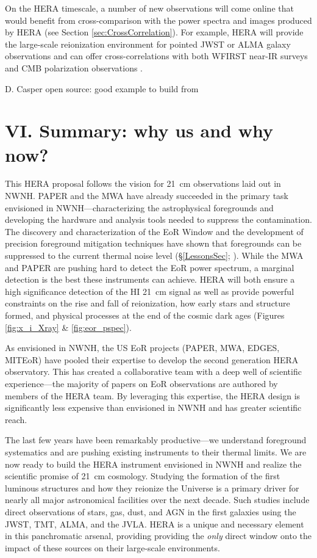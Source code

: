 \documentclass[preprint]{aastex}
\def\HI{{H{\small I }}}
\begin{document}
On the HERA timescale, a number of new observations will come online that would benefit from cross-comparison with the power spectra and images produced by HERA (see Section \ref{sec:CrossCorrelation}). For example, HERA will provide the large-scale reionization environment for pointed JWST or ALMA galaxy observations and can offer cross-correlations with both WFIRST near-IR surveys \citep{lidz_et_al2009} and CMB polarization observations \citep{tashiro_et_al2010}.
 
D. Casper open source: good example to build from


\section{VI. Summary: why us and why now?} %

This HERA proposal follows the vision for 21~cm observations laid out in NWNH.
PAPER and the MWA have already succeeded in the primary task envisioned in
NWNH---characterizing the astrophysical foregrounds and developing the hardware
and analysis 
tools needed to suppress the contamination. The discovery and
characterization of the EoR Window and the development of precision foreground
mitigation techniques have shown that foregrounds can be suppressed to the current
thermal noise level (\S \ref{LessonsSec}; \citealt{parsons_et_al2013}). While the MWA
and PAPER are pushing hard to detect the EoR power spectrum, %
a marginal detection is the best these instruments can achieve.
HERA will both ensure a high significance detection of the \HI 21~cm 
signal as
well as provide powerful constraints on the rise and fall of reionization, how
early stars and structure formed, and physical processes at the end of the
cosmic dark ages (Figures \ref{fig:x_i_Xray} \& \ref{fig:eor_pspec}).

As envisioned in NWNH, the US EoR projects (PAPER, MWA, EDGES, MITEoR) have
pooled their expertise to develop the second generation HERA observatory. This
has created a collaborative team with a deep well of scientific
experience---the majority of papers on EoR observations are authored by members
of the HERA team. By leveraging this expertise, the HERA design is significantly
less expensive than envisioned in 
NWNH and has greater scientific reach.

The last few years have been remarkably productive---we
understand foreground systematics and are pushing 
existing
instruments to their thermal limits. We are now ready to build the HERA
instrument envisioned in NWNH and realize the scientific promise of 21~cm
cosmology.
Studying the formation of the first luminous structures 
and how they reionize the Universe is a primary driver for 
nearly all major astronomical facilities over the next decade.
Such studies include direct 
observations of stars, gas, dust, and AGN in the
first galaxies using the JWST, TMT, ALMA, and the JVLA. HERA is 
a unique and necessary element in this panchromatic arsenal, providing
providing the \emph{only} direct window onto the impact of these sources on 
their large-scale environments.


\clearpage
\setcounter{page}{1}
\thispagestyle{empty}
%
%


\end{document}
